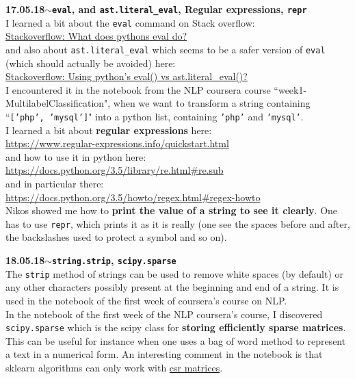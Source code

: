 \documentclass[11pt,a4paper]{article}
\newenvironment{loggentry}[2]%
{\noindent\textbf{#1}\hspace{1cm}$\mathbf{\sim}$\text{ }\textbf{#2}\\}{\vspace{0.5cm}}
\begin{document}
\begin{loggentry}{17.05.18}{\texttt{eval}, and \texttt{ast.literal\_eval}, Regular expressions, \texttt{repr}}
I learned a bit about the \texttt{eval} command on Stack overflow:\\
\href{https://stackoverflow.com/questions/9383740/what-does-pythons-eval-do#9383764}{Stackoverflow: What does pythons eval do?}\\
and also about \texttt{ast.literal\_eval} which seems to be a safer version of \texttt{eval} (which should actually be avoided) here:\\
\href{https://stackoverflow.com/questions/15197673/using-pythons-eval-vs-ast-literal-eval#15197698}{Stackoverflow: Using python's eval() vs ast.literal\_eval()?}\\
I encountered it in the notebook from the NLP coursera course ``week1-MultilabelClassification", when we want to transform a string containing ``\texttt{['php', 'mysql']}" into a python list, containing \texttt{'php'} and  \texttt{'mysql'}.\\

I learned a bit about \textbf{regular expressions} here:\\
\url{https://www.regular-expressions.info/quickstart.html}\\
and how to use it in python here:\\
\url{https://docs.python.org/3.5/library/re.html#re.sub}\\
and in particular there:\\
\url{https://docs.python.org/3.5/howto/regex.html#regex-howto}\\

Nikos showed me how to \textbf{print the value of a string to see it clearly}. One has to use \texttt{repr}, which prints it as it is really (one see the spaces before and after, the backslashes used to protect a symbol and so on).
\end{loggentry}

\begin{loggentry}{18.05.18}{\texttt{string.strip}, \texttt{scipy.sparse}}
The \texttt{strip} method of strings can be used to remove white spaces (by default) or any other characters possibly present at the beginning and end of a string. It is used in the notebook of the first week of coursera's course on NLP.\\

In the notebook of the first week of the NLP coursera's course, I discovered \texttt{scipy.sparse} which is the scipy class for \textbf{storing efficiently sparse matrices}. This can be useful for instance when one uses a bag of word method to represent a text in a numerical form. An interesting comment in the notebook is that sklearn algorithms can only work with \href{https://docs.scipy.org/doc/scipy/reference/generated/scipy.sparse.csr_matrix.html#scipy.sparse.csr_matrix}{csr matrices}.\\
\end{loggentry}
\end{document}
